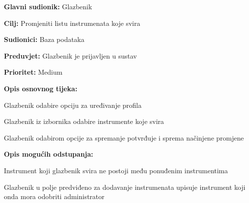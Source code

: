 \noindent {}
	\begin{packed_item}
		
		\item \textbf{Glavni sudionik:} Glazbenik
		\item \textbf{Cilj:} Promjeniti listu instrumenata koje svira
		\item \textbf{Sudionici:} Baza podataka
		\item \textbf{Preduvjet:} Glazbenik je prijavljen u sustav
		\item \textbf{Prioritet:} Medium
		\item \textbf{Opis osnovnog tijeka:}
		
		\item[] \begin{packed_enum}
			\item Glazbenik odabire opciju za uređivanje profila
			\item Glazbenik iz izbornika odabire instrumente koje svira
			\item Glazbenik odabirom opcije za spremanje potvrđuje i sprema načinjene promjene
		\end{packed_enum}
		
		\item  \textbf{Opis mogućih odstupanja:}
		
		\item[] \begin{packed_item}
			
			\item[2.a] Instrument koji glazbenik svira ne postoji među ponuđenim instrumentima
			\item[] \begin{packed_enum}
				
				\item Glazbenik u polje predviđeno za dodavanje instrumenata upisuje instrument koji onda mora odobriti administrator
				
			\end{packed_enum}	
		\end{packed_item}
	\end{packed_item}

